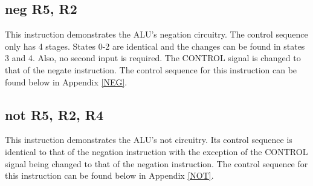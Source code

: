 \documentclass{article}
\begin{document}

    \subsection{neg R5, R2}
    This instruction demonstrates the ALU's negation circuitry. The control sequence only has 4 stages. States 0-2 are identical and the changes can be found in states 3 and 4. Also, no second input is required. The CONTROL signal is changed to that of the negate instruction. The control sequence for this instruction can be found below in Appendix \ref{NEG}.


    \subsection{not R5, R2, R4}
    This instruction demonstrates the ALU's not circuitry. Its control sequence is identical to that of the negation instruction with the exception of the CONTROL signal being changed to that of the negation instruction. The control sequence for this instruction can be found below in Appendix \ref{NOT}.


\appendix
% 
\end{document}
